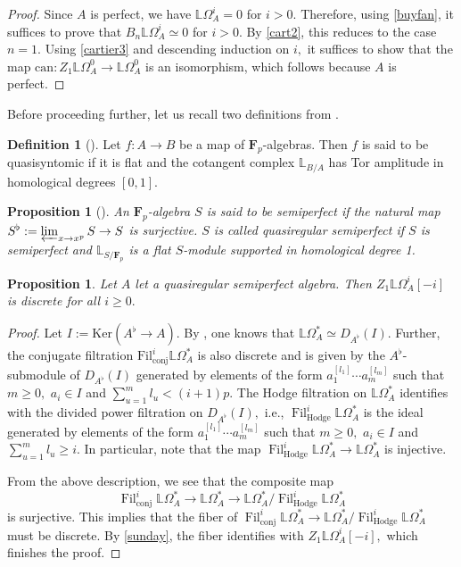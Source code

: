 \documentclass[10pt,letterpaper]{amsart}
\numberwithin{figure}{section}
\numberwithin{equation}{section}
\newtheorem{proposition}[figure]{Proposition}
\theoremstyle{definition}
\newtheorem{definition}[figure]{Definition}
\theoremstyle{definition}
\theoremstyle{definition}
\theoremstyle{definition}
\DeclareMathOperator{\conj}{conj}
\DeclareMathOperator{\Hodge}{Hodge}
\DeclareMathOperator{\Fil}{Fil}
\newcommand{\LL}{\L}
\renewcommand{\L}{\mathbb{L}}
\newcommand{\F}{\mathbf{F}}
\begin{document}
\begin{proof}
    Since $A$ is perfect, we have $\LL \Omega_A^i =0$ for $i>0.$ Therefore, using \cref{buyfan}, it suffices to prove that $B_n \LL \Omega^i_A \simeq 0$ for $i>0.$ By \cref{cart2}, this reduces to the case $n=1.$ Using \cref{cartier3} and descending induction on $i,$ it suffices to show that the map $\mathrm{can}: Z_1 \LL \Omega^0_A \to \LL \Omega^0_A$ is an isomorphism, which follows because $A$ is perfect.
\end{proof}{}


Before proceeding further, let us recall two definitions from \cite{BMS2}.

\begin{definition}[{\cite[Def.~4.10]{BMS2}}]
    Let $f: A \to B$ be a map of $\F_p$-algebras. Then $f$ is said to be quasisyntomic if it is flat and the cotangent complex $\LL_{B/A}$ has Tor amplitude in homological degrees $[0,1].$
\end{definition}{}

\begin{proposition}[{\cite[Def.~8.8]{BMS2}}]
    An $\F_p$-algebra $S$ is said to be semiperfect if the natural map $S^\flat:= \varprojlim_{x \to x^p} S \to S$ is surjective. $S$ is called quasiregular semiperfect if $S$ is semiperfect and $\L_{S/\F_p}$ is a flat $S$-module supported in homological degree 1.
\end{proposition}{}


\begin{proposition}\label{coollemma}
    Let $A$ let a quasiregular semiperfect algebra. Then $Z_1 \LL \Omega^i_A[-i]$ is discrete for all $i \ge 0.$
\end{proposition}{}

\begin{proof}
    Let $I:= \mathrm{Ker}(A^\flat \to A).$ By \cite[Prop.~8.12]{BMS2}, one knows that $\LL \Omega^*_A \simeq D_{A^\flat}(I).$ Further, the conjugate filtration $\mathrm{Fil}^i_{\mathrm{conj}}\LL \Omega^*_A$ is also discrete and is given by the $A^\flat$-submodule of $D_{A^\flat}(I)$ generated by elements of the form $a_1^{[l_1]} \cdots  a_m^{[l_m]}$ such that $m \ge 0,$ $a_i \in I$ and $\sum _{u=1}^{m} l_u < (i+1)p.$ The Hodge filtration on $\LL\Omega^*_A$ identifies with the divided power filtration on $D_{A^\flat}(I),$ i.e., $\Fil^i_{\Hodge} \LL\Omega_A^*$ is the ideal generated by elements of the form $a_1^{[l_1]} \cdots  a_m^{[l_m]}$ such that $m \ge 0,$ $a_i \in I$ and $\sum _{u=1}^{m} l_u \ge i.$ In particular, note that the map $\Fil^i_{\Hodge} \LL\Omega^*_A \to \LL \Omega_A^*$ is injective. 

From the above description, we see that the composite map $$\Fil^i_{\conj} \LL\Omega^*_A \to \LL\Omega^*_A \to \LL\Omega^*_A / \Fil^i_{\Hodge} \LL\Omega^*_A$$ is surjective. This implies that the fiber of $\Fil^i_{\conj} \LL\Omega^*_A  \to \LL\Omega^*_A / \Fil^i_{\Hodge} \LL\Omega^*_A$ must be discrete. By \cref{sunday}, the fiber identifies with $Z_1\LL\Omega_A^i [-i],$ which finishes the proof.
\end{proof}
\end{document}
